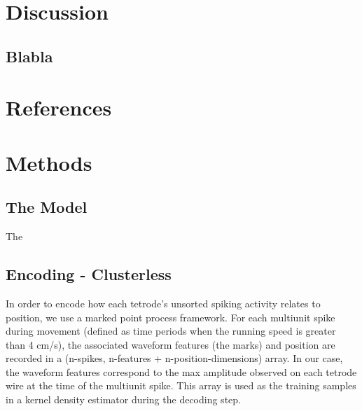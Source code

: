 \documentclass[times, twoside]{zHenriquesLab-StyleBioRxiv}
\begin{document}
\section*{Discussion}


\subsection*{Blabla} 

\begin{acknowledgements}
\end{acknowledgements}

\section*{References}


\onecolumn
\newpage

\section*{Methods}
\subsection*{The Model}
The 

\subsection*{Encoding - Clusterless}
In order to encode how each tetrode's unsorted spiking activity relates to position, we use a marked point process framework. For each multiunit spike during movement (defined as time periods when the running speed is greater than 4 cm/s), the associated waveform features (the marks) and position are recorded in a (n-spikes, n-features + n-position-dimensions) array. In our case, the waveform features correspond to the max amplitude observed on each tetrode wire at the time of the multiunit spike. This array is used as the training samples in a kernel density estimator during the decoding step.
\end{document}
